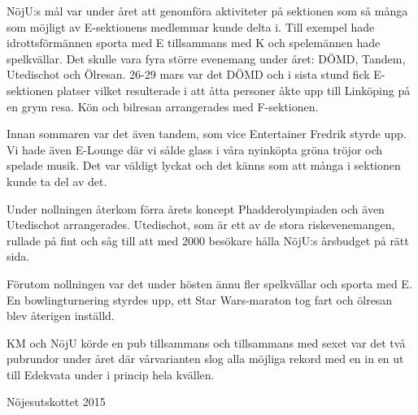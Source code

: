 \documentclass[../_main/handlingar.tex]{subfiles}
\begin{document}

NöjU:s mål var under året att genomföra aktiviteter på sektionen som så många som möjligt av E-sektionens medlemmar kunde delta i. Till exempel hade idrottsförmännen sporta med E tillsammans med K och spelemännen hade spelkvällar. Det skulle vara fyra större evenemang under året: DÖMD, Tandem, Utedischot och Ölresan. 26-29 mars var det DÖMD och i sista stund fick E-sektionen platser vilket resulterade i att åtta personer åkte upp till Linköping på en grym resa. Kön och bilresan arrangerades med F-sektionen.

Innan sommaren var det även tandem, som vice Entertainer Fredrik styrde upp. Vi hade även E-Lounge där vi sålde glass i våra nyinköpta gröna tröjor och spelade musik. Det var väldigt lyckat och det känns som att många i sektionen kunde ta del av det.

Under nollningen återkom förra årets koncept Phadderolympiaden och även Utedischot arrangerades. Utedischot, som är ett av de stora riskevenemangen, rullade på fint och såg till att med 2000 besökare hålla NöjU:s årsbudget på rätt sida.

Förutom nollningen var det under hösten ännu fler spelkvällar och sporta med E. En bowlingturnering styrdes upp, ett Star Wars-maraton tog fart och ölresan blev återigen inställd.

KM och NöjU körde en pub tillsammans och tillsammans med sexet var det två pubrundor under året där vårvarianten slog alla möjliga rekord med en in en ut till Edekvata under i princip hela kvällen.

\begin{signatures}{1}
    \mvh
    \signature{Emil Nilén}{Nöjesutskottet 2015}
\end{signatures}
\end{document}
